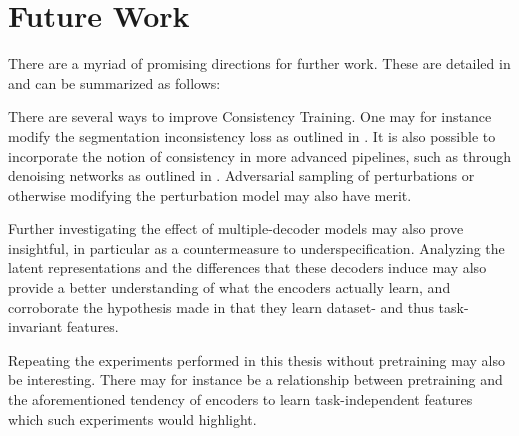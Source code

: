         
\section{Future Work}
There are a myriad of promising directions for further work. These are detailed in  and can be summarized as follows:

There are several ways to improve Consistency Training. One may for instance modify the segmentation inconsistency loss as outlined in . It is also possible to incorporate the notion of consistency in more advanced pipelines, such as through denoising networks as outlined in . Adversarial sampling of perturbations or otherwise modifying the perturbation model may also have merit.  

Further investigating the effect of multiple-decoder models may also prove insightful, in particular as a countermeasure to underspecification. Analyzing the latent representations and the differences that these decoders induce may also provide a better understanding of what the encoders actually learn, and corroborate the hypothesis made in  that they learn dataset- and thus task-invariant features. 

Repeating the experiments performed in this thesis without pretraining may also be interesting. There may for instance be a relationship between pretraining and the aforementioned tendency of encoders to learn task-independent features which such experiments would highlight.  

